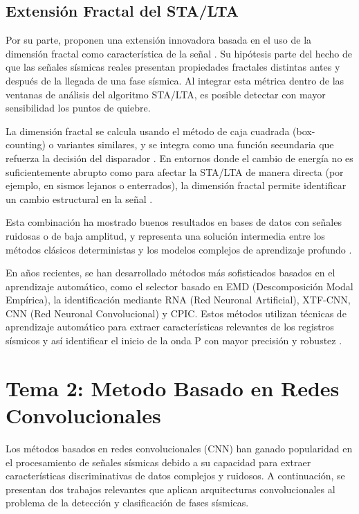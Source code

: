 \subsection{Extensión Fractal del STA/LTA}

Por su parte, \cite{zhang2018sta} proponen una extensión innovadora basada en el uso de la dimensión fractal como característica de la señal \cite{zhang2018sta}. Su hipótesis parte del hecho de que las señales sísmicas reales presentan propiedades fractales distintas antes y después de la llegada de una fase sísmica. Al integrar esta métrica dentro de las ventanas de análisis del algoritmo STA/LTA, es posible detectar con mayor sensibilidad los puntos de quiebre.

La dimensión fractal se calcula usando el método de caja cuadrada (box-counting) o variantes similares, y se integra como una función secundaria que refuerza la decisión del disparador \cite{zhang2018sta}. En entornos donde el cambio de energía no es suficientemente abrupto como para afectar la STA/LTA de manera directa (por ejemplo, en sismos lejanos o enterrados), la dimensión fractal permite identificar un cambio estructural en la señal \cite{zhang2018sta}.

Esta combinación ha mostrado buenos resultados en bases de datos con señales ruidosas o de baja amplitud, y representa una solución intermedia entre los métodos clásicos deterministas y los modelos complejos de aprendizaje profundo \cite{zhang2018sta}.

En años recientes, se han desarrollado métodos más sofisticados basados en el aprendizaje automático, como el selector basado en EMD (Descomposición Modal Empírica), la identificación mediante RNA (Red Neuronal Artificial), XTF-CNN, CNN (Red Neuronal Convolucional) y CPIC. Estos métodos utilizan técnicas de aprendizaje automático para extraer características relevantes de los registros sísmicos y así identificar el inicio de la onda P con mayor precisión y robustez \cite{zhu2019deep} \cite{bi2021explainable} \cite{zhang2018sta}.

\section{Tema 2: Metodo Basado en Redes Convolucionales}

Los métodos basados en redes convolucionales (CNN) han ganado popularidad en el procesamiento de señales sísmicas debido a su capacidad para extraer características discriminativas de datos complejos y ruidosos. A continuación, se presentan dos trabajos relevantes que aplican arquitecturas convolucionales al problema de la detección y clasificación de fases sísmicas.

